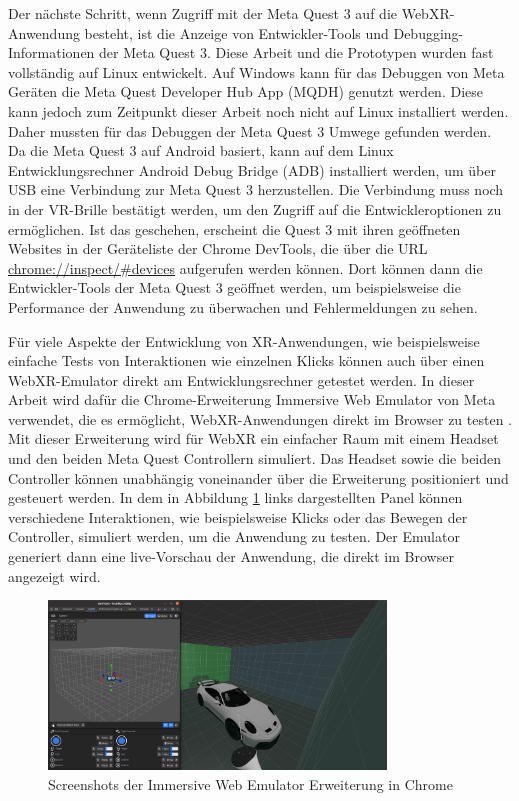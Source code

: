 Der nächste Schritt, wenn Zugriff mit der Meta Quest 3 auf die WebXR-Anwendung besteht, ist die Anzeige von Entwickler-Tools und Debugging-Informationen der Meta Quest 3.
Diese Arbeit und die Prototypen wurden fast vollständig auf Linux entwickelt.
Auf Windows kann für das Debuggen von Meta Geräten die Meta Quest Developer Hub App (MQDH) genutzt werden.
Diese kann jedoch zum Zeitpunkt dieser Arbeit noch nicht auf Linux installiert werden.
Daher mussten für das Debuggen der Meta Quest 3 Umwege gefunden werden.
Da die Meta Quest 3 auf Android basiert, kann auf dem Linux Entwicklungsrechner Android Debug Bridge (ADB) installiert werden, um über USB eine Verbindung zur Meta Quest 3 herzustellen.
Die Verbindung muss noch in der VR-Brille bestätigt werden, um den Zugriff auf die Entwickleroptionen zu ermöglichen.
Ist das geschehen, erscheint die Quest 3 mit ihren geöffneten Websites in der Geräteliste der Chrome DevTools, die über die URL \url{chrome://inspect/#devices} aufgerufen werden können.
Dort können dann die Entwickler-Tools der Meta Quest 3 geöffnet werden, um beispielsweise die Performance der Anwendung zu überwachen und Fehlermeldungen zu sehen.


Für viele Aspekte der Entwicklung von XR-Anwendungen, wie beispielsweise einfache Tests von Interaktionen wie einzelnen Klicks können auch über einen WebXR-Emulator direkt am Entwicklungsrechner getestet werden.
In dieser Arbeit wird dafür die Chrome-Erweiterung Immersive Web Emulator von Meta verwendet, die es ermöglicht, WebXR-Anwendungen direkt im Browser zu testen \autocite{immersive-web-emulator}.
Mit dieser Erweiterung wird für WebXR ein einfacher Raum mit einem Headset und den beiden Meta Quest Controllern simuliert.
Das Headset sowie die beiden Controller können unabhängig voneinander über die Erweiterung positioniert und gesteuert werden.
In dem in Abbildung \ref{fig:webxr-emulator} links dargestellten Panel können verschiedene Interaktionen, wie beispielsweise Klicks oder das Bewegen der Controller, simuliert werden, um die Anwendung zu testen.
Der Emulator generiert dann eine live-Vorschau der Anwendung, die direkt im Browser angezeigt wird.

\begin{figure}[H]
    \centering
    \includegraphics[width=0.8\textwidth]{images/WebXR-Emulator.png}
    \caption{Screenshots der Immersive Web Emulator Erweiterung in Chrome}
    \label{fig:webxr-emulator}
\end{figure}

